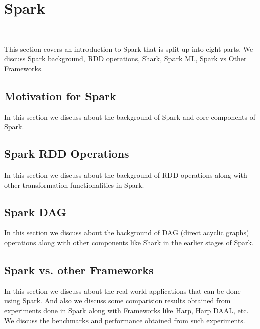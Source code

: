 \chapter{Spark}
\label{c:spark}
\FILENAME\

This section covers an introduction to Spark that is split up
into eight parts. We discuss Spark background, RDD operations,
Shark, Spark ML, Spark vs Other Frameworks.


\section{Motivation for Spark}
\label{s:motivation-spark}

In this section we discuss about the background of Spark and
core components of Spark.



\section{Spark RDD Operations}

In this section we discuss about the background of RDD operations
along with other transformation functionalities in Spark.



\section{Spark DAG}

In this section we discuss about the background of DAG (direct acyclic
graphs) operations along with other components like Shark in the
earlier stages of Spark.



\section{Spark vs. other Frameworks}

In this section we discuss about the real world applications that can
be done using Spark.  And also we discuss some comparision results
obtained from experiments done in Spark along with Frameworks like
Harp, Harp DAAL, etc. We discuss the benchmarks and performance
obtained from such experiments.





